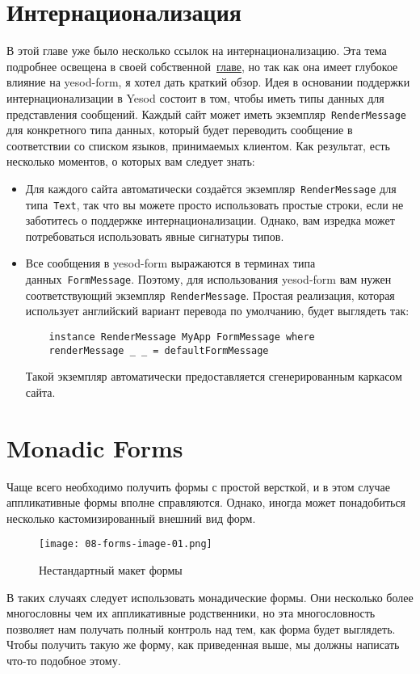 \section{Интернационализация}
В этой главе уже было несколько ссылок на интернационализацию. Эта тема
подробнее освещена в своей собственной~\hyperref[chap:i18n]{главе}, но так как
она имеет глубокое влияние на yesod-form, я хотел дать краткий обзор.  Идея в
основании поддержки интернационализации в Yesod состоит в том, чтобы иметь
типы данных для представления сообщений. Каждый сайт может иметь
экземпляр~\lstinline'RenderMessage' для конкретного типа данных, который будет
переводить сообщение в соответствии со списком языков, принимаемых клиентом.
Как результат, есть несколько моментов, о которых вам следует знать:
\begin{itemize}
    \item  Для каждого сайта автоматически создаётся
        экземпляр~\lstinline'RenderMessage' для типа~\lstinline'Text', так что
        вы можете просто использовать простые строки, если не заботитесь о
        поддержке интернационализации. Однако, вам изредка может потребоваться
        использовать явные сигнатуры типов.

    \item Все сообщения в yesod-form выражаются в терминах типа
        данных~\lstinline'FormMessage'.  Поэтому, для использования yesod-form
        вам нужен соответствующий экземпляр~\lstinline'RenderMessage'. Простая
        реализация, которая использует английский вариант перевода по
        умолчанию, будет выглядеть так:
\begin{lstlisting}
    instance RenderMessage MyApp FormMessage where
    renderMessage _ _ = defaultFormMessage
\end{lstlisting}
        Такой экземпляр автоматически предоставляется сгенерированным каркасом
        сайта.
\end{itemize}

\section{Monadic Forms}
Чаще всего необходимо получить формы с простой версткой, и в этом случае аппликативные формы 
вполне справляются. Однако, иногда может понадобиться несколько кастомизированный 
внешний вид форм.

\begin{figure}[tbph]
  \centering
  \texttt{[image: 08-forms-image-01.png]}
  \caption{Нестандартный макет формы}
\end{figure}
В таких случаях следует использовать монадические формы. Они несколько более 
многословны чем их аппликативные родственники, но эта многословность позволяет нам
получать полный контроль над тем, как форма будет выглядеть. Чтобы получить такую же
форму, как приведенная выше, мы должны написать что-то подобное этому.

